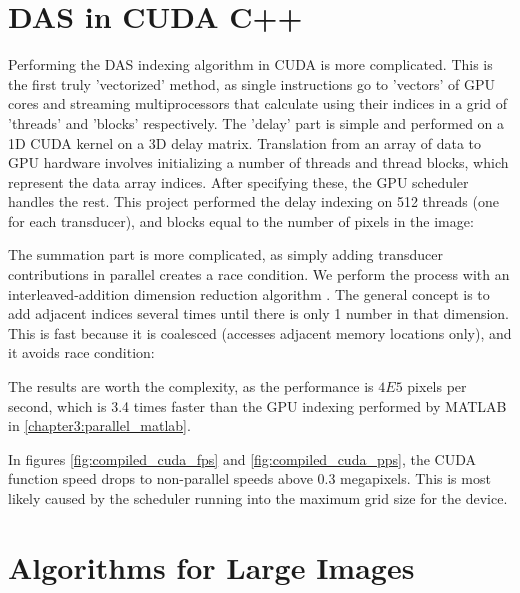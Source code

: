 \section{DAS in CUDA C++}
\label{chapter3:CUDA_DAS}

    Performing the DAS indexing algorithm in CUDA is more complicated. This is the first truly 'vectorized' method, as single instructions go to 'vectors' of GPU cores and streaming multiprocessors that calculate using their indices in a grid of 'threads' and 'blocks' respectively\cite{CUDARefresherCUDA2020}. The 'delay' part is simple and performed on a 1D CUDA kernel on a 3D delay matrix. Translation from an array of data to GPU hardware involves initializing a number of threads and thread blocks, which represent the data array indices. After specifying these, the GPU scheduler handles the rest. This project performed the delay indexing on 512 threads (one for each transducer), and blocks equal to the number of pixels in the image:

    

    The summation part is more complicated, as simply adding transducer contributions in parallel creates a race condition. We perform the process with an interleaved-addition dimension reduction algorithm \cite{harrisOptimizingParallelReduction}. The general concept is to add adjacent indices several times until there is only 1 number in that dimension. This is fast because it is coalesced (accesses adjacent memory locations only), and it avoids race condition:

    

    The results are worth the complexity, as the performance is $4E5$ pixels per second, which is 3.4 times faster than the GPU indexing performed by MATLAB in \ref{chapter3:parallel_matlab}.


    In figures \ref{fig:compiled_cuda_fps} and \ref{fig:compiled_cuda_pps}, the CUDA function speed drops to non-parallel speeds above 0.3 megapixels. This is most likely caused by the scheduler running into the maximum grid size for the device.

\section{Algorithms for Large Images}
\label{chapter3:Large_Images}


